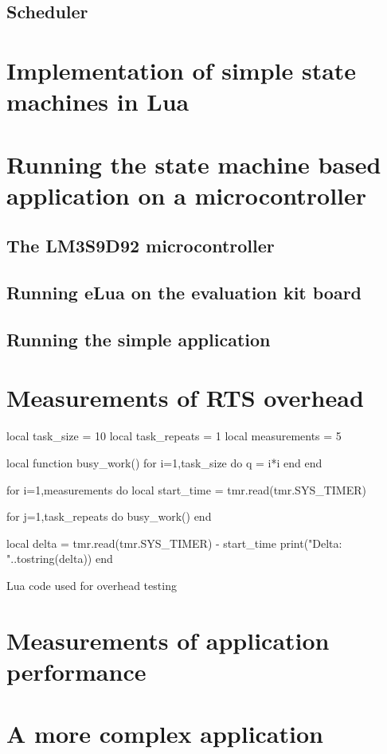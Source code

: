 \subsection{Scheduler}
\label{sec:impl_sched}


\section{Implementation of simple state machines in Lua}
\label{sec:impl_state_machines}

\section{Running the state machine based application on a microcontroller}
\label{sec:running_on_micro}

\subsection{The LM3S9D92 microcontroller}

\subsection{Running eLua on the evaluation kit board}

\subsection{Running the simple application}

\section{Measurements of RTS overhead}
\label{sec:overhead_measure}

\begin{listing}[H]
\begin{luacode}
local task_size = 10
local task_repeats = 1
local measurements = 5

local function busy_work()
	for i=1,task_size do
		q = i*i
	end
end

for i=1,measurements do
	local start_time = tmr.read(tmr.SYS_TIMER)

	for j=1,task_repeats do
		busy_work()
	end

	local delta = tmr.read(tmr.SYS_TIMER) - start_time
	print("Delta: "..tostring(delta))
end
\end{luacode}
	\caption{Lua code used for overhead testing}
	\label{code:overhead}
\end{listing}

\section{Measurements of application performance}
\label{sec:performance_measure}

\section{A more complex application}
\label{sec:impl_complex_app}
